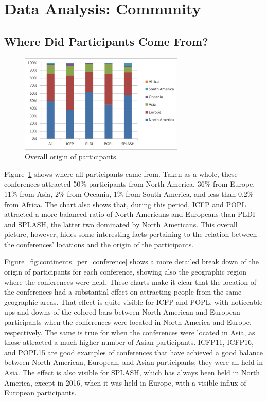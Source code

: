 \section{Data Analysis: Community}

\subsection{Where Did Participants Come From?}

\begin{figure}
  \centering
  \includegraphics[width=0.7\textwidth]{figs/ParticipantsOrigin.pdf}
  \caption{Overall origin of participants.}
  \label{fig:continents}
\end{figure}

Figure~\ref{fig:continents} shows where all participants came from. Taken as a whole, these conferences attracted 50\% participants from North America, 36\% from Europe, 11\% from Asia, 2\% from Oceania, 1\% from South America, and less than 0.2\% from Africa. The chart also shows that, during this period, ICFP and POPL attracted a more balanced ratio of North Americans and Europeans than PLDI and SPLASH, the latter two dominated by North Americans. This overall picture, however, hides some interesting facts pertaining to the relation between the conferences' locations and the origin of the participants. 

Figure~\ref{fig:continents_per_conference} shows a more detailed break down of the origin of participants for each conference, showing also the geographic region where the conferences were held. These charts make it clear that the location of the conferences had a substantial effect on attracting people from the same geographic areas. That effect is quite visible for ICFP and POPL, with noticeable ups and downs of the colored bars between North American and European participants when the conferences were located in North America and Europe, respectively. The same is true for when the conferences were located in Asia, as those attracted a much higher number of Asian participants. ICFP11, ICFP16, and POPL15 are good examples of conferences that have achieved a good balance between North American, European, and Asian participants; they were all held in Asia. The effect is also visible for SPLASH, which has always been held in North America, except in 2016, when it was held in Europe, with a visible influx of European participants. 

